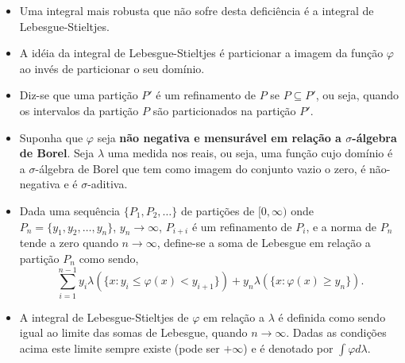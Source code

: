 \begin{frame}

%
\begin{block}{}
\begin{itemize}
\item Uma integral mais robusta que não sofre desta deficiência é a integral de Lebesgue-Stieltjes. 

\item A idéia da integral de Lebesgue-Stieltjes é particionar a imagem da função $\varphi$ ao invés de particionar o seu domínio. 

\item Diz-se que uma partição $P'$ é um refinamento de $P$ se $P\subseteq P'$, ou seja, quando os intervalos da partição $P$ são particionados na partição $P'$. 

\item Suponha que $\varphi$ seja {\bf não negativa e mensurável em relação a $\sigma$-álgebra de Borel}. Seja $\lambda$  uma medida nos reais, ou seja, uma função cujo domínio é a $\sigma$-álgebra de Borel que tem como imagem do conjunto vazio o zero, é não-negativa e é $\sigma$-aditiva. 

\item Dada uma sequência $\{P_1,P_2,\ldots\}$ de partições de $[0,\infty)$ onde $P_n=\{y_1,y_2,\ldots,y_n\}$, $y_n\rightarrow\infty$, $P_{i+i}$ é um refinamento de $P_i$, e a norma de $P_n$ tende a zero quando $n\rightarrow\infty$, define-se a soma de Lebesgue em relação a partição $P_n$ como sendo,
$$\sum_{i=1}^{n-1}y_i\lambda(\{x:y_i\leq \varphi(x)<y_{i+1}\})+y_n\lambda(\{x:\varphi(x)\geq y_n\}).$$

\item A integral de Lebesgue-Stieltjes de $\varphi$ em relação a $\lambda$ é definida como sendo igual ao limite das somas de Lebesgue,
quando $n\rightarrow\infty$. Dadas as condições acima este limite sempre existe (pode ser $+\infty$) e é denotado por $\int \varphi d\lambda$.
%
\end{itemize}
\end{block}
\end{frame}
%
